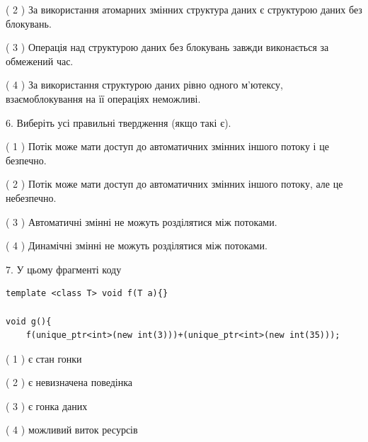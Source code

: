 \documentclass[12pt, ukrainian]{article}
\begin{document}
\begin {large}
{( 2 ) За використання атомарних змінних структура даних є структурою даних без блокувань.%

( 3 ) Операція над структурою даних без блокувань завжди виконається за обмежений час.%

( 4 ) За використання структурою даних рівно одного м’ютексу, взаємоблокування на її операціях неможливі.%
\newpage



\vspace{5mm}
6. Виберіть усі правильні твердження (якщо такі є).\par
\vspace{2mm}

( 1 ) Потік може мати доступ до автоматичних змінних іншого потоку і це безпечно.%

( 2 ) Потік може мати доступ до автоматичних змінних іншого потоку, але це небезпечно.%

( 3 ) Автоматичні змінні не можуть розділятися між потоками.%

( 4 ) Динамічні змінні не можуть розділятися між потоками.%


\vspace{5mm}
7. У цьому фрагменті коду
\begin{verbatim}
template <class T> void f(T a){}

void g(){
    f(unique_ptr<int>(new int(3)))+(unique_ptr<int>(new int(35)));
\end{verbatim}

( 1 ) є стан гонки%

( 2 ) є невизначена поведінка%

( 3 ) є гонка даних%

( 4 ) можливий виток ресурсів%
}
\end {large}
\end{document}
